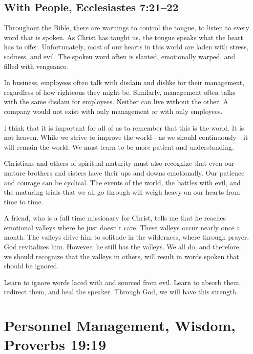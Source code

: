 \documentclass[12pt]{memoir}
\begin{document}
\subsection[With People]{With People, Ecclesiastes 7:21--22}
 

Throughout the Bible, there are warnings to control the tongue,
to listen to every word that is spoken. As Christ has
taught us, the tongue speaks what the heart has to offer. Unfortunately, most of our hearts in this world are laden with stress, sadness, and evil. The spoken word often is slanted, emotionally warped, and filled with vengeance. 

In business, employees often talk with disdain and dislike for their
management, regardless of how righteous they might be. Similarly,
management often talks with the same disdain for employees. Neither
can live without the other. A company would not exist with only management or with only employees. 

I think that it is important for all of us to remember that this is
the world. It is not heaven. While we strive to improve the world---as we should continuously---it will remain the world. We must learn to be more patient and understanding. 

Christians and others of spiritual maturity must also recognize
that even our mature brothers and sisters have their ups and downs
emotionally. Our patience and courage can be cyclical. The events
of the world, the battles with evil, and the maturing trials that
we all go through will weigh heavy on our hearts from time
to time.

A friend, who is a full time missionary for Christ, tells
me that he reaches emotional valleys where he just doesn't care. These valleys occur nearly once a month. The valleys drive him to solitude in the wilderness, where through prayer, God revitalizes him. However, he still has the valleys. We all do, and therefore, we should recognize that the valleys in others, will result in words spoken that should be ignored.

Learn to ignore words laced with and sourced from evil. Learn to absorb them, redirect them, and heal the speaker. Through God, we will have this strength.

\section[Wisdom in Personnel Management]{Personnel Management, Wisdom, Proverbs 19:19}
   
\end{document}
